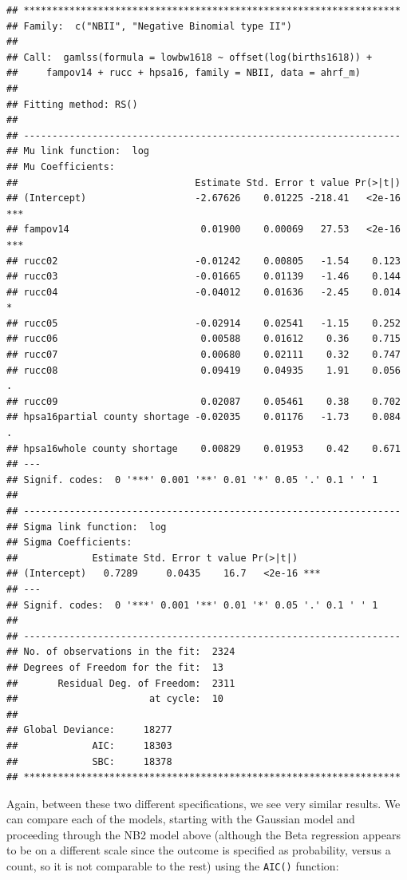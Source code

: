 \documentclass[
]{article}
\begin{document}
\begin{verbatim}
## ******************************************************************
## Family:  c("NBII", "Negative Binomial type II") 
## 
## Call:  gamlss(formula = lowbw1618 ~ offset(log(births1618)) +  
##     fampov14 + rucc + hpsa16, family = NBII, data = ahrf_m) 
## 
## Fitting method: RS() 
## 
## ------------------------------------------------------------------
## Mu link function:  log
## Mu Coefficients:
##                               Estimate Std. Error t value Pr(>|t|)    
## (Intercept)                   -2.67626    0.01225 -218.41   <2e-16 ***
## fampov14                       0.01900    0.00069   27.53   <2e-16 ***
## rucc02                        -0.01242    0.00805   -1.54    0.123    
## rucc03                        -0.01665    0.01139   -1.46    0.144    
## rucc04                        -0.04012    0.01636   -2.45    0.014 *  
## rucc05                        -0.02914    0.02541   -1.15    0.252    
## rucc06                         0.00588    0.01612    0.36    0.715    
## rucc07                         0.00680    0.02111    0.32    0.747    
## rucc08                         0.09419    0.04935    1.91    0.056 .  
## rucc09                         0.02087    0.05461    0.38    0.702    
## hpsa16partial county shortage -0.02035    0.01176   -1.73    0.084 .  
## hpsa16whole county shortage    0.00829    0.01953    0.42    0.671    
## ---
## Signif. codes:  0 '***' 0.001 '**' 0.01 '*' 0.05 '.' 0.1 ' ' 1
## 
## ------------------------------------------------------------------
## Sigma link function:  log
## Sigma Coefficients:
##             Estimate Std. Error t value Pr(>|t|)    
## (Intercept)   0.7289     0.0435    16.7   <2e-16 ***
## ---
## Signif. codes:  0 '***' 0.001 '**' 0.01 '*' 0.05 '.' 0.1 ' ' 1
## 
## ------------------------------------------------------------------
## No. of observations in the fit:  2324 
## Degrees of Freedom for the fit:  13
##       Residual Deg. of Freedom:  2311 
##                       at cycle:  10 
##  
## Global Deviance:     18277 
##             AIC:     18303 
##             SBC:     18378 
## ******************************************************************
\end{verbatim}

Again, between these two different specifications, we see very similar results. We can compare each of the models, starting with the Gaussian model and proceeding through the NB2 model above (although the Beta regression appears to be on a different scale since the outcome is specified as probability, versus a count, so it is not comparable to the rest) using the \texttt{AIC()} function:
\end{document}
